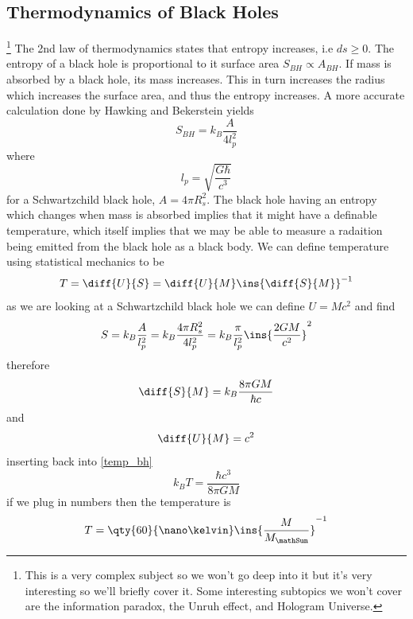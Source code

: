 \subsection{Thermodynamics of Black Holes}
\footnote{This is a very complex subject so we won't go deep into it but it's very interesting so we'll briefly cover it. Some interesting subtopics we won't cover are the information paradox, the Unruh effect, and Hologram Universe.}
The 2nd law of thermodynamics states that entropy increases, i.e \(ds \geq 0\). The entropy of a black hole is proportional to it surface area \(S_{BH} \propto A_{BH}\). If mass is absorbed by a black hole, its mass increases. This in turn increases the radius which increases the surface area, and thus the entropy increases. A more accurate calculation done by Hawking and Bekerstein yields
\begin{equation}
    S_{BH} = k_B \frac{A}{4l_p^2}
\end{equation}
where
\begin{equation}
    l_p = \sqrt{\frac{G\hbar}{c^3}}
\end{equation}
for a Schwartzchild black hole, \(A = 4\pi R_s^2\). The black hole having an entropy which changes when mass is absorbed implies that it might have a definable temperature, which itself implies that we may be able to measure a radaition being emitted from the black hole as a black body. We can define temperature using statistical mechanics to be
\begin{equation}\label{temp_bh}
    T = \diff{U}{S} = \diff{U}{M}\ins{\diff{S}{M}}^{-1}
\end{equation}
as we are looking at a Schwartzchild black hole we can define \(U=Mc^2\) and find
\begin{equation}
    S = k_B\frac{A}{l_p^2}=k_B\frac{4\pi R_s^2}{4l_p^2}=k_B\frac{\pi}{l_p^2}\ins{\frac{2GM}{c^2}}^2
\end{equation}
therefore
\begin{equation}
    \diff{S}{M} = k_B\frac{8\pi GM}{\hbar c}
\end{equation}
and
\begin{equation}
    \diff{U}{M} = c^2
\end{equation}
inserting back into \ref{temp_bh}
\begin{equation}
    k_B T = \frac{\hbar c^3}{8\pi GM}
\end{equation}
if we plug in numbers then the temperature is
\begin{equation}
    T = \qty{60}{\nano\kelvin}\ins{\frac{M}{M_\mathSun}}^{-1}
\end{equation}
